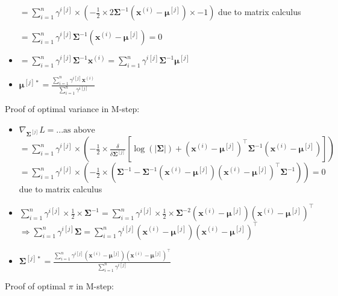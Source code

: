 \begin{itemize}
    $
    = \sum_{i=1}^n \gamma^{i[j]} \times \left( -\frac{1}{2} \times 2\boldsymbol{\Sigma}^{-1} (\boldsymbol{x}^{(i)} - \boldsymbol{\mu}^{[j]}) \times -1 \right)
    $ due to matrix calculus

    $
    = \sum_{i=1}^n \gamma^{i[j]} \boldsymbol{\Sigma}^{-1} (\boldsymbol{x}^{(i)} - \boldsymbol{\mu}^{[j]}) = 0
    $
        
    \item $
    = \sum_{i=1}^n \gamma^{i[j]} \boldsymbol{\Sigma}^{-1} \boldsymbol{x}^{(i)} = \sum_{i=1}^n \gamma^{i[j]} \boldsymbol{\Sigma}^{-1}\boldsymbol{\mu}^{[j]}
    $

    \item $
    \boldsymbol{\mu}^{[j]*} = \frac{\sum_{i=1}^n \gamma^{i[j]} \boldsymbol{x}^{(i)}}{\sum_{i=1}^n \gamma^{i[j]}}
    $
\end{itemize}
Proof of optimal variance in M-step:
\begin{itemize}
    \item $ \nabla_{\boldsymbol{\Sigma}^{[j]}} L = ... \text{as above}
    $
    $
    = \sum_{i=1}^n \gamma^{i[j]} \times \left( -\frac{1}{2} \times \frac{\delta}{\delta \boldsymbol{\Sigma}^{[j]}} \left[ \log(|\boldsymbol{\Sigma}|)+ (\boldsymbol{x}^{(i)} - \boldsymbol{\mu}^{[j]})^\intercal \boldsymbol{\Sigma}^{-1} (\boldsymbol{x}^{(i)} - \boldsymbol{\mu}^{[j]}) \right] \right)
    $
    $
    = \sum_{i=1}^n \gamma^{i[j]} \times \left( -\frac{1}{2} \times (\boldsymbol{\Sigma}^{-1} - \boldsymbol{\Sigma}^{-1} (\boldsymbol{x}^{(i)} - \boldsymbol{\mu}^{[j]})(\boldsymbol{x}^{(i)} - \boldsymbol{\mu}^{[j]})^\intercal \boldsymbol{\Sigma}^{-1}) \right) = 0
    $ due to matrix calculus
    \item $
    \sum_{i=1}^n \gamma^{i[j]} \times \frac{1}{2} \times \boldsymbol{\Sigma}^{-1} =  \sum_{i=1}^n \gamma^{i[j]} \times \frac{1}{2} \times \boldsymbol{\Sigma}^{-2} (\boldsymbol{x}^{(i)} - \boldsymbol{\mu}^{[j]})(\boldsymbol{x}^{(i)} - \boldsymbol{\mu}^{[j]})^\intercal
    $
    $
    \Rightarrow \sum_{i=1}^n \gamma^{i[j]} \boldsymbol{\Sigma} =  \sum_{i=1}^n \gamma^{i[j]} (\boldsymbol{x}^{(i)} - \boldsymbol{\mu}^{[j]})(\boldsymbol{x}^{(i)} - \boldsymbol{\mu}^{[j]})^\intercal
    $
    \item $
    \boldsymbol{\Sigma}^{[j]*} = \frac{\sum_{i=1}^n \gamma^{i[j]} (\boldsymbol{x}^{(i)} - \boldsymbol{\mu}^{[j]})(\boldsymbol{x}^{(i)} - \boldsymbol{\mu}^{[j]})^\intercal}{\sum_{i=1}^n \gamma^{i[j]}}
    $
\end{itemize}
Proof of optimal $\pi$ in M-step:

